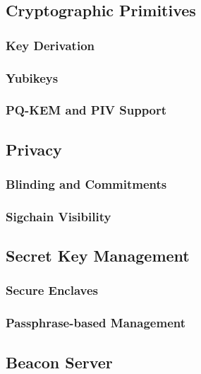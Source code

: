 \subsection{Cryptographic Primitives}
\label{sec:cryptography}

\subsubsection{Key Derivation}

\subsubsection{Yubikeys}


\subsubsection{PQ-KEM and PIV Support}

\subsection{Privacy}

\subsubsection{Blinding and Commitments}
\label{sec:commitments}

\subsubsection{Sigchain Visibility}

\subsection{Secret Key Management}

\subsubsection{Secure Enclaves}

\subsubsection{Passphrase-based Management}

\subsection{Beacon Server}
